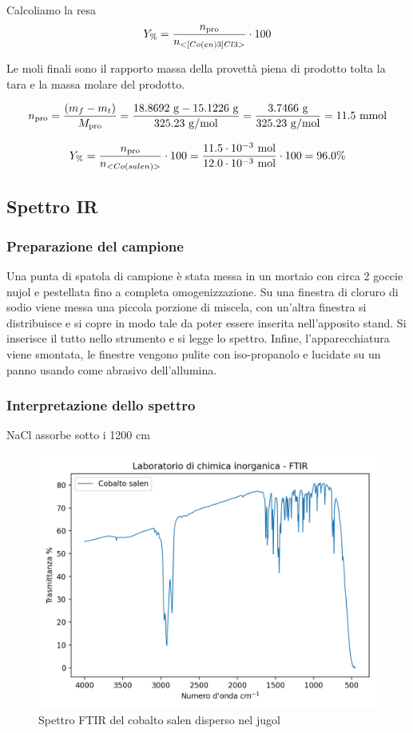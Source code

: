 Calcoliamo la resa 
\[ Y_\% = \frac{n_\text{pro}}{n_{<[Co(en)3]Cl3>}}\cdot 100 \]

Le moli finali sono il rapporto massa della provettà piena di prodotto tolta la tara e la massa molare del prodotto.

\[ n_\text{pro} = \frac{(m_{f} - m_{t})}{M_\text{pro}} 
 = \frac{ 18.8692 \mathrm{\ g} - 15.1226 \mathrm{\ g} }{ 325.23 \mathrm{\ g/mol}} =  \frac{3.7466 \mathrm{~g}}{325.23 \mathrm{~g} / \mathrm{mol}}=11.5 \mathrm{\ mmol}\]

\[ Y_\% = \frac{n_\text{pro}}{n_{<Co(salen)>}}\cdot 100  = \frac{  11.5 \cdot 10^{-3} \mathrm{~mol}}{12.0 \cdot 10^{-3} \mathrm{~mol}} \cdot 100 =96.0\%\]


\subsection{Spettro IR}


\subsubsection{Preparazione del campione}
Una punta di spatola di campione è stata messa in un mortaio con circa 2 goccie nujol e pestellata fino a completa omogenizzazione.  Su una finestra di cloruro di sodio viene messa una piccola porzione di miscela, con un'altra finestra si distribuisce e si copre in modo tale da poter essere inserita nell'apposito stand. Si inserisce il tutto nello strumento e si legge lo spettro. Infine, l'apparecchiatura viene smontata, le finestre vengono pulite con iso-propanolo  e lucidate su un panno usando come abrasivo dell'allumina.
\subsubsection{Interpretazione dello spettro}

NaCl assorbe sotto i 1200 cm
\begin{figure}[ht!]
    \centering
    \includegraphics{Relazione/foto/FTIRsalen.png}
    \caption{Spettro FTIR del cobalto salen disperso nel jugol}
    \label{fig:FTIRsalen}
\end{figure}
